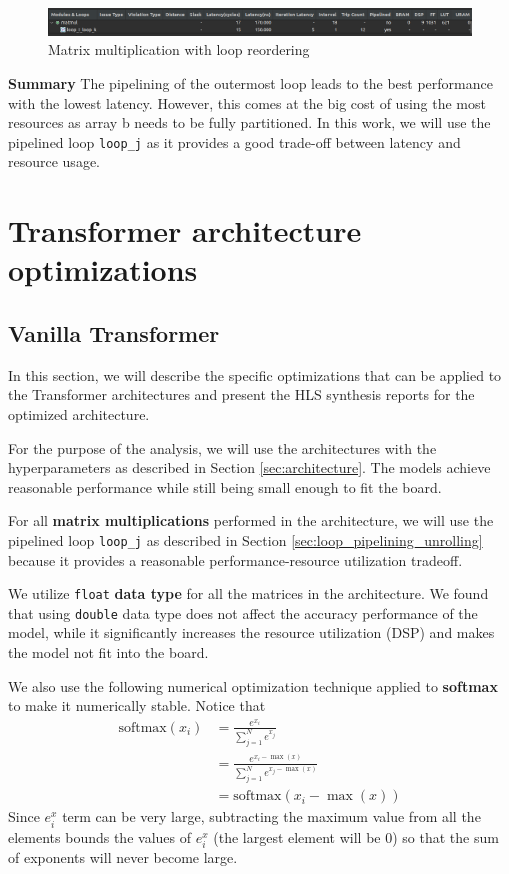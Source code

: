 \documentclass[a4paper, twoside]{report}
\theoremstyle{definition}
\numberwithin{equation}{section}
\begin{document}
\begin{figure}[h!]
    \centering
    \includegraphics[width=\textwidth]{matmul_loop_reordering.png}
    \caption{Matrix multiplication with loop reordering}
    \label{fig:matmul_loop_reordering}
\end{figure}

\textbf{Summary}
The pipelining of the outermost loop leads to the best performance with the lowest latency.
However, this comes at the big cost of using the most resources as array b
needs to be fully partitioned.
In this work, we will use the pipelined loop \texttt{loop\_j}
as it provides a good trade-off between latency and resource usage.

\section{Transformer architecture optimizations} \label{sec:transformer_optimizations}

\subsection{Vanilla Transformer}

In this section, we will describe the specific optimizations that can be applied to the Transformer architectures
and present the HLS synthesis reports for the optimized architecture.

For the purpose of the analysis, we will use the architectures with the
hyperparameters as described in Section \ref{sec:architecture}.
The models achieve reasonable performance while still being small enough
to fit the board.

For all \textbf{matrix multiplications} performed in the architecture, we will use the pipelined loop \texttt{loop\_j}
as described in Section \ref{sec:loop_pipelining_unrolling} because
it provides a reasonable performance-resource utilization tradeoff.

We utilize \texttt{float} \textbf{data type} for all the matrices in the architecture.
We found that using \texttt{double} data type does not affect the accuracy performance
of the model, while it significantly increases the resource utilization (DSP)
and makes the model not fit into the board.

We also use the following numerical optimization technique applied to \textbf{softmax}
to make it numerically stable.
Notice that
\begin{align*}
    \text{softmax}(x_i) & = \frac{e^{x_i}}{\sum_{j=1}^{N} e^{x_j}}                     \\
                        & = \frac{e^{x_i - \max(x)}}{\sum_{j=1}^{N} e^{x_j - \max(x)}} \\
                        & = \text{softmax}(x_i - \max(x))
\end{align*}
Since $e^x_i$ term can be very large, subtracting the maximum value from all the elements
bounds the values of $e^x_i$ (the largest element will be 0) so that the
sum of exponents will never become large.
\end{document}
